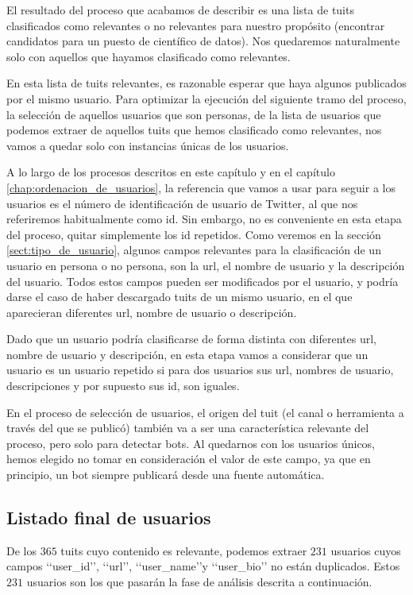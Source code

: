 El resultado del proceso que acabamos de describir
es una lista de tuits clasificados como relevantes o no relevantes
para nuestro propósito (encontrar candidatos para un puesto de científico de datos).
Nos quedaremos naturalmente solo con aquellos que hayamos clasificado como relevantes.

En esta lista de tuits relevantes, es razonable esperar que haya algunos 
publicados por el mismo usuario. Para optimizar la ejecución
del siguiente tramo del proceso, la selección de aquellos usuarios que son personas, 
de la lista de usuarios que podemos extraer de aquellos tuits que hemos clasificado como
relevantes, nos vamos a quedar solo con instancias únicas de los usuarios.

A lo largo de los procesos descritos en este capítulo y en el capítulo
\ref{chap:ordenacion_de_usuarios},
la referencia que vamos a usar para seguir a los usuarios es el número de identificación 
de usuario de Twitter, al que nos referiremos habitualmente como id.
Sin embargo, no es conveniente en esta etapa del proceso, quitar simplemente los id 
repetidos. Como veremos en la sección \ref{sect:tipo_de_usuario}, algunos campos relevantes
para la clasificación de un usuario en persona o no persona, son 
la url, el nombre de usuario y la descripción del usuario. Todos estos campos
pueden ser modificados por el usuario, y podría darse el caso de haber descargado
tuits de un mismo usuario, en el que aparecieran diferentes url, nombre de usuario o
descripción.

Dado que un usuario podría clasificarse de forma distinta con diferentes url, nombre de usuario y 
descripción, en esta etapa vamos a considerar que un usuario es un usuario repetido si para dos 
usuarios sus url, nombres de usuario, descripciones y por supuesto sus id, son iguales.

En el proceso de selección de usuarios, el origen del tuit (el canal o herramienta a través del que 
se publicó) también va a ser una característica relevante del proceso, pero solo para detectar bots. 
Al quedarnos con los usuarios únicos, hemos elegido no tomar en consideración el valor de
este campo, ya que en principio, un bot siempre publicará desde una fuente automática.


\subsection{Listado final de usuarios}
De los $365$ tuits cuyo contenido es relevante, podemos extraer $231$ usuarios cuyos campos
\lq\lq user\_id\rq\rq, \lq\lq url\rq\rq, \lq\lq user\_name\rq\rq y \lq\lq user\_bio\rq\rq
no están duplicados. Estos $231$ usuarios son los que pasarán la fase de análisis descrita a continuación.



